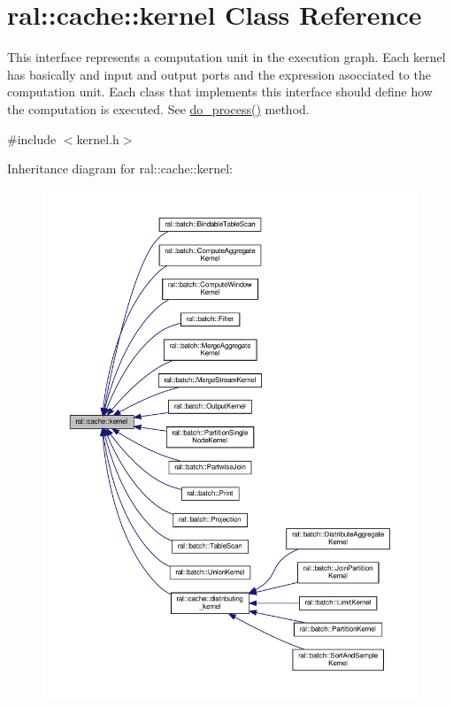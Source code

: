 \hypertarget{classral_1_1cache_1_1kernel}{}\section{ral\+:\+:cache\+:\+:kernel Class Reference}
\label{classral_1_1cache_1_1kernel}


This interface represents a computation unit in the execution graph. Each kernel has basically and input and output ports and the expression asocciated to the computation unit. Each class that implements this interface should define how the computation is executed. See {\ttfamily \hyperlink{classral_1_1cache_1_1kernel_aa8d19c5f112f8965ea2f9999fb5fd625}{do\+\_\+process()}} method.  




{\ttfamily \#include $<$kernel.\+h$>$}



Inheritance diagram for ral\+:\+:cache\+:\+:kernel\+:\nopagebreak
\begin{figure}[H]
\begin{center}
\leavevmode
\includegraphics[width=350pt]{classral_1_1cache_1_1kernel__inherit__graph}
\end{center}
\end{figure}


